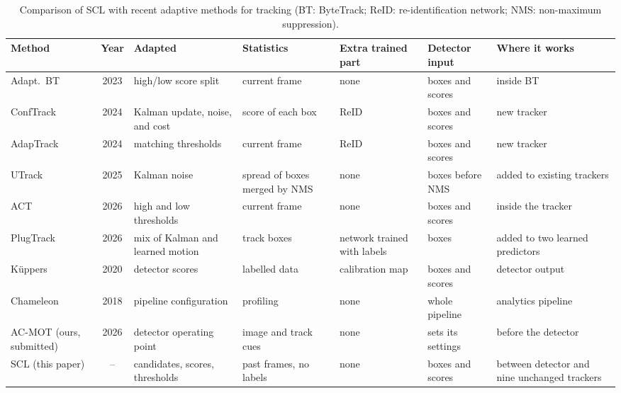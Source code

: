 \documentclass[pdflatex,sn-mathphys-num]{sn-jnl}
\newcommand{\scl}{SCL}
\begin{document}
\begin{table}[t]
\caption{Comparison of \scl{} with recent adaptive methods for tracking (BT: ByteTrack; ReID: re-identification network; NMS: non-maximum suppression).}
\label{tab:related}
\centering\scriptsize
\setlength{\tabcolsep}{2.5pt}
\begin{tabular}{@{}>{\raggedright\arraybackslash}p{19mm}c>{\raggedright\arraybackslash}p{22mm}>{\raggedright\arraybackslash}p{20mm}>{\raggedright\arraybackslash}p{15mm}>{\raggedright\arraybackslash}p{15mm}>{\raggedright\arraybackslash}p{22mm}@{}}
\toprule
Method & Year & Adapted & Statistics & Extra trained part & Detector input & Where it works\\
\midrule
Adapt.\ BT \cite{ma2023adaptivebytetrack} & 2023 & high/low score split & current frame & none & boxes and scores & inside BT\\
ConfTrack \cite{jung2024conftrack} & 2024 & Kalman update, noise, and cost & score of each box & ReID & boxes and scores & new tracker\\
AdapTrack \cite{shim2024adaptrack} & 2024 & matching thresholds & current frame & ReID & boxes and scores & new tracker\\
UTrack \cite{solano2025utrack} & 2025 & Kalman noise & spread of boxes merged by NMS & none & boxes before NMS & added to existing trackers\\
ACT \cite{act2026adaptive} & 2026 & high and low thresholds & current frame & none & boxes and scores & inside the tracker\\
PlugTrack \cite{kim2026plugtrack} & 2026 & mix of Kalman and learned motion & track boxes & network trained with labels & boxes & added to two learned predictors\\
K{\"u}ppers \cite{kuppers2020detcalib} & 2020 & detector scores & labelled data & calibration map & boxes and scores & detector output\\
Chameleon \cite{jiang2018chameleon} & 2018 & pipeline configuration & profiling & none & whole pipeline & analytics pipeline\\
AC-MOT (ours, submitted) & 2026 & detector operating point & image and track cues & none & sets its settings & before the detector\\
\scl{} (this paper) & -- & candidates, scores, thresholds & past frames, no labels & none & boxes and scores & between detector and nine unchanged trackers\\
\bottomrule
\end{tabular}
\end{table}
\end{document}
